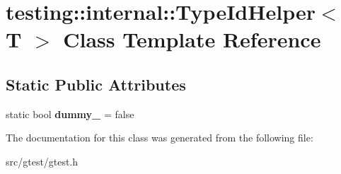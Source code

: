 \hypertarget{classtesting_1_1internal_1_1_type_id_helper}{}\section{testing\+:\+:internal\+:\+:Type\+Id\+Helper$<$ T $>$ Class Template Reference}
\label{classtesting_1_1internal_1_1_type_id_helper}
\subsection*{Static Public Attributes}
\begin{DoxyCompactItemize}
\item 
\mbox{\label{classtesting_1_1internal_1_1_type_id_helper_a372268b1520d965d0bdf01ebad3d270e}} 
static bool {\bfseries dummy\+\_\+} = false
\end{DoxyCompactItemize}


The documentation for this class was generated from the following file\+:\begin{DoxyCompactItemize}
\item 
src/gtest/gtest.\+h\end{DoxyCompactItemize}
